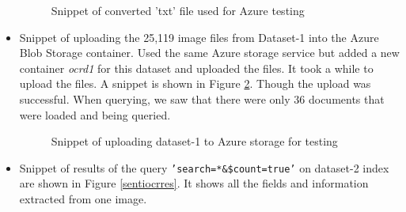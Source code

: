 \begin{itemize}
\begin{figure}[h!h]
      \caption{Snippet of converted 'txt' file used for Azure testing}
      \label{aztextinputfile}
    \end{figure}
    \item Snippet of uploading the 25,119 image files from Dataset-1 into the Azure Blob Storage container. Used the same Azure storage service but added a new container \textit{ocrd1} for this dataset and uploaded the files. It took a while to upload the files. A snippet is shown in Figure \ref{ocrd1upload}. Though the upload was successful. When querying, we saw that there were only 36 documents that were loaded and being queried. 
    \begin{figure}[h!h]
      \centering
      \caption{Snippet of uploading dataset-1 to Azure storage for testing}
      \label{ocrd1upload}
    \end{figure}
    \newpage
    \item Snippet of results of the query \texttt{’search=*\&\$count=true’} on dataset-2 index are shown in Figure \ref{sentiocrres}. It shows all the fields and information extracted from one image.
    \begin{figure}[h!h]
      \centering

\end{figure}
\end{itemize}
